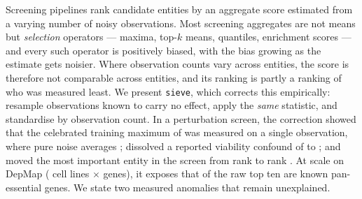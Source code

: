 Screening pipelines rank candidate entities by an aggregate score estimated from a varying
number of noisy observations. Most screening aggregates are not means but \emph{selection}
operators --- maxima, top-$k$ means, quantiles, enrichment scores --- and every such operator
is positively biased, with the bias growing as the estimate gets noisier. Where observation
counts vary across entities, the score is therefore not comparable across entities, and its
ranking is partly a ranking of who was measured least. We present \texttt{sieve}, which
corrects this empirically: resample observations known to carry no effect, apply the
\emph{same} statistic, and standardise by observation count. In a perturbation screen, the
correction showed that the celebrated training maximum of \ObesityTrainingMax{} was measured
on a single observation, where pure noise averages \ObesityNullMeanAtOne{}; dissolved a
reported viability confound of \ObesityConfoundRaw{} to \ObesityConfoundCal{}; and moved the
most important entity in the screen from rank \ObesityRankBefore{} to rank
\ObesityRankAfter{}. At scale on DepMap (\DepmapCellLines{} cell lines $\times$
\DepmapGenesScored{} genes), it exposes that  of the raw top
ten are known pan-essential genes. We state two measured anomalies that remain unexplained.
